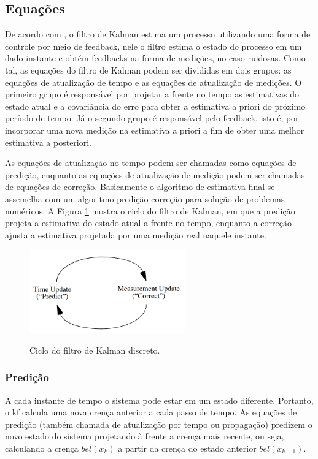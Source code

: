 \documentclass[acronym, symbols, table]{fei}
\begin{document}
		\subsection{Equações} \label{sec:filtro_de_kalman_equacoes}
			
			De acordo com \textcite{khodarahmi2023review}, o filtro de Kalman estima um processo utilizando uma forma de controle por meio de feedback, nele o filtro estima o estado do processo em um dado instante e obtém feedbacks na forma de medições, no caso ruidosas. Como tal, as equações do filtro de Kalman podem ser divididas em dois grupos: as equações de atualização de tempo e as equações de atualização de medições. O primeiro grupo é responsável por projetar a frente no tempo as estimativas do estado atual e a covariância do erro para obter a estimativa a priori do próximo período de tempo. Já o segundo grupo é responsável pelo feedback, isto é, por incorporar uma nova medição na estimativa a priori a fim de obter uma melhor estimativa a posteriori.
			
			As equações de atualização no tempo podem ser chamadas como equações de predição, enquanto as equações de atualização de medição podem ser chamadas de equações de correção. Basicamente o algoritmo de estimativa final se assemelha com um algoritmo predição-correção para solução de problemas numéricos. A Figura \ref{fig:predicao_atualizacao_kalman} mostra o ciclo do filtro de Kalman, em que a predição projeta a estimativa do estado atual a frente no tempo, enquanto a correção ajusta a estimativa projetada por uma medição real naquele instante.
			
			\begin{figure}[!htb]
				\centering
				\caption{Ciclo do filtro de Kalman discreto.} 
				\includegraphics[width=0.6\textwidth]{predicao_atualizacao_kalman.png}
				\label{fig:predicao_atualizacao_kalman}
			\end{figure}
			
			\subsubsection{Predição}
				A cada instante de tempo o sistema pode estar em um estado diferente. Portanto, o \acrshort{kf} calcula uma nova crença anterior a cada passo de tempo. As equações de predição (também chamada de atualização por tempo ou propagação) predizem o novo estado do sistema projetando à frente a crença mais recente, ou seja, calculando a crença $bel(x_k)$ a partir da crença do estado anterior $bel(x_{k-1})$. 
				
\end{document}
